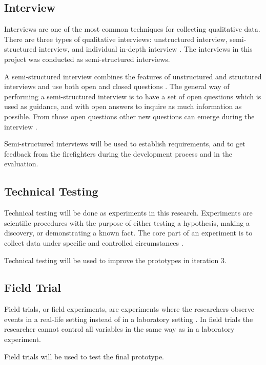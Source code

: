 \documentclass[../Main/thesis.tex]{subfiles}
\begin{document}
\subsection{Interview}
Interviews are one of the most common techniques for collecting qualitative data.
There are three types of qualitative interviews: unstructured interview, semi-structured interview, and individual in-depth interview \citep{DiCicco-Bloom2006}.
The interviews in this project was conducted as semi-structured interviews.

A semi-structured interview combines the features of unstructured and structured interviews and use both open and closed questions \citep{Preece2011}.
The general way of performing a semi-structured interview is to have a set of open questions which is used as guidance, and with open answers to inquire as much information as possible.
From those open questions other new questions can emerge during the interview \citep{DiCicco-Bloom2006}.

Semi-structured interviews will be used to establish requirements, and to get feedback from the firefighters during the development process and in the evaluation. 

\subsection{Technical Testing}
Technical testing will be done as experiments in this research.
Experiments are scientific procedures with the purpose of either testing a hypothesis, making a discovery, or demonstrating a known fact.
The core part of an experiment is to collect data under specific and controlled circumstances \citep{Hellevik2002}.

Technical testing will be used to improve the prototypes in iteration 3.

\subsection{Field Trial}
Field trials, or field experiments, are experiments where the researchers observe events in a real-life setting instead of in a laboratory setting \citep{oates2005researching}.
In field trials the researcher cannot control all variables in the same way as in a laboratory experiment.

Field trials will be used to test the final prototype.
\end{document}
